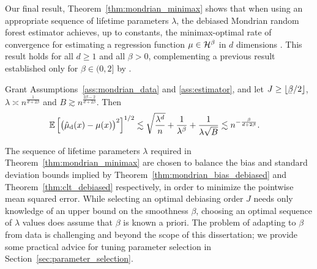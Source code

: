 Our final result, Theorem~\ref{thm:mondrian_minimax} shows that
when using an appropriate sequence of lifetime parameters $\lambda$,
the debiased Mondrian random forest estimator
achieves, up to constants, the minimax-optimal rate of convergence
for estimating a regression function $\mu \in \mathcal{H}^\beta$
in $d$ dimensions \citep{stone1982optimal}.
This result holds for all $d \geq 1$ and all $\beta > 0$,
complementing a previous result established only for $\beta \in (0, 2]$
by \citet{mourtada2020minimax}.
%
\begin{theorem}%
  \label{thm:mondrian_minimax}
  Grant Assumptions~\ref{ass:mondrian_data} and \ref{ass:estimator},
  and let $J \geq \lfloor \flbeta / 2 \rfloor$,
  $\lambda \asymp n^{\frac{1}{d + 2 \beta}}$ and
  $B \gtrsim n^{\frac{2 \beta - 2}{d + 2 \beta}}$. Then
  \begin{align*}
    \mathbb{E} \left[
      \big( \hat \mu_{\mathrm{d}}(x) - \mu(x) \big)^2
    \right]^{1/2}
    &\lesssim
    \sqrt{\frac{\lambda^d}{n}}
    + \frac{1}{\lambda^\beta}
    + \frac{1}{\lambda \sqrt B}
    \lesssim
    n^{-\frac{\beta}{d + 2 \beta}}.
  \end{align*}
\end{theorem}

The sequence of lifetime parameters $\lambda$ required in
Theorem~\ref{thm:mondrian_minimax} are chosen to balance the bias and standard
deviation bounds implied by Theorem~\ref{thm:mondrian_bias_debiased} and
Theorem~\ref{thm:clt_debiased} respectively, in order to minimize the pointwise
mean squared error. While selecting an optimal debiasing order $J$ needs only
knowledge of an upper bound on the smoothness $\beta$, choosing an optimal
sequence of $\lambda$ values does assume that $\beta$ is known a priori. The
problem of adapting to $\beta$ from data is challenging and beyond the scope of
this dissertation; we provide some practical advice for tuning parameter
selection in Section~\ref{sec:parameter_selection}.

